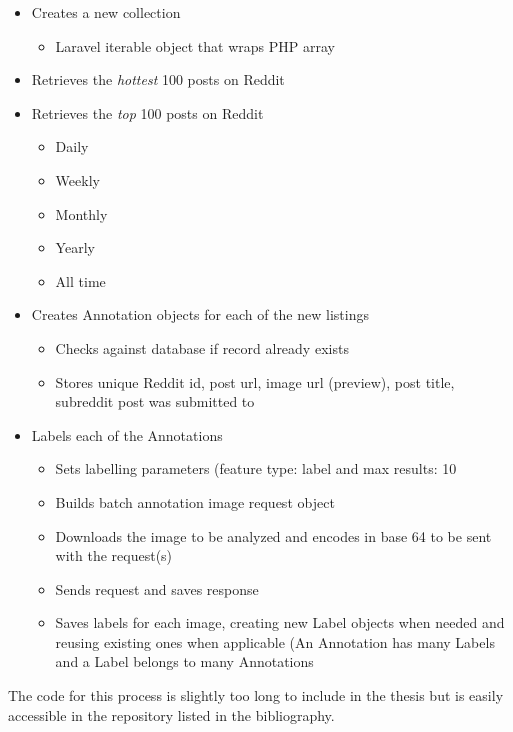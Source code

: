 \documentclass[msc,oneside]{ubcthesis}%
\begin{document}
\begin{itemize}
\item{Creates a new collection}
	\begin{itemize}
	\item{Laravel iterable object that wraps PHP array}
	\end{itemize}
\item{Retrieves the \textit{hottest} 100 posts on Reddit}
\item{Retrieves the \textit{top} 100 posts on Reddit}
	\begin{itemize}
	\item{Daily}
	\item{Weekly}
	\item{Monthly}
	\item{Yearly}
	\item{All time}	
	\end{itemize}
\item{Creates Annotation objects for each of the new listings}
	\begin{itemize}
	\item{Checks against database if record already exists}
	\item{Stores unique Reddit id, post url, image url (preview), post title, subreddit post was submitted to}
	\end{itemize}
\item{Labels each of the Annotations}
	\begin{itemize}
	\item{Sets labelling parameters (feature type: label and max results: 10}
	\item{Builds batch annotation image request object}
	\item{Downloads the image to be analyzed and encodes in base 64 to be sent with the request(s)}
	\item{Sends request and saves response}
	\item{Saves labels for each image, creating new Label objects when needed and reusing existing ones when applicable (An Annotation has many Labels and a Label belongs to many Annotations}
	\end{itemize}
\end{itemize}

The code for this process is slightly too long to include in the thesis but is easily accessible in the repository listed in the bibliography.
\end{document}
